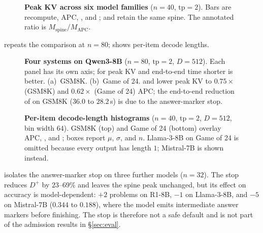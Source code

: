 \begin{figure}[t]
\centering
\resizebox{\textwidth}{!}{}
\caption{\textbf{Peak KV across six model families} ($n{=}40$, $\mathrm{tp}{=}2$).
Bars are recompute, APC, \cowonly, and \sys; \cowonly and \sys retain the same spine.
The annotated ratio is $M_{\mathrm{spine}}/M_{\mathrm{APC}}$.}
\label{fig:eval-multi}
\end{figure}

 repeats the comparison at $n{=}80$;  shows per-item decode lengths.

\begin{figure}[t]
\centering
\resizebox{\columnwidth}{!}{}
\caption{\textbf{Four systems on Qwen3-8B} ($n{=}80$, $\mathrm{tp}{=}2$, $D{=}512$).
Each panel has its own axis; for peak KV and end-to-end time shorter is better.
(a)~GSM8K. (b)~Game of 24.
\cowonly and \sys lower peak KV to $0.75\times$ (GSM8K) and $0.62\times$ (Game of 24) APC; the end-to-end reduction of \sys on GSM8K ($36.0$ to $28.2$\,s) is due to the answer-marker stop.}
\label{fig:eval-radar}
\end{figure}

\begin{figure}[t]
\centering
\resizebox{\textwidth}{!}{}
\caption{\textbf{Per-item decode-length histograms} ($n{=}40$, $\mathrm{tp}{=}2$, $D{=}512$, bin width $64$).
GSM8K (top) and Game of 24 (bottom) overlay APC, \cowonly, and \sys; boxes report $\mu$, $\sigma$, and $n$.
Llama-3-8B on Game of 24 is omitted because every output has length $1$; Mistral-7B is shown instead.}
\label{fig:eval-hist}
\end{figure}

 isolates the answer-marker stop on three further models ($n{=}32$).
The stop reduces $D^{+}$ by $23$--$69\%$ and leaves the spine peak unchanged, but its effect on accuracy is model-dependent: $+2$ problems on R1-8B, $-1$ on Llama-3-8B, and $-5$ on Mistral-7B ($0.344$ to $0.188$), where the model emits intermediate answer markers before finishing.
The stop is therefore not a safe default and is not part of the admission results in \S\ref{sec:eval}.

